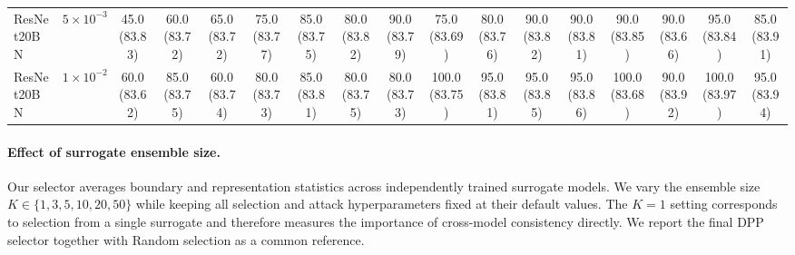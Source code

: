 \begin{table}[t]
{\begin{tabular}{lc|c|cc|cc|cc|cc|cc|cc|cc}
\midrule

ResNet20BN &
$5{\times}10^{-3}$ &
45.0 \small{(83.83)} &
60.0 \small{(83.72)} & 65.0 \small{(83.72)} &
75.0 \small{(83.77)} & 85.0 \small{(83.75)} &
80.0 \small{(83.82)} & 90.0 \small{(83.79)} &
75.0 \small{(83.69)} & 80.0 \small{(83.76)} &
90.0 \small{(83.82)} & 90.0 \small{(83.81)} &
90.0 \small{(83.85)} & 90.0 \small{(83.66)} &
95.0 \small{(83.84)} & 85.0 \small{(83.91)} \\

ResNet20BN &
$1{\times}10^{-2}$ &
60.0 \small{(83.62)} &
85.0 \small{(83.75)} & 60.0 \small{(83.74)} &
80.0 \small{(83.73)} & 85.0 \small{(83.81)} &
80.0 \small{(83.75)} & 80.0 \small{(83.73)} &
100.0 \small{(83.75)} & 95.0 \small{(83.81)} &
95.0 \small{(83.85)} & 95.0 \small{(83.86)} &
100.0 \small{(83.68)} & 90.0 \small{(83.92)} &
100.0 \small{(83.97)} & 95.0 \small{(83.94)} \\

\bottomrule
\end{tabular}
}
\end{table}


\paragraph{Effect of surrogate ensemble size.}
Our selector averages boundary and representation statistics across
independently trained surrogate models. We vary the ensemble size
$K\in\{1,3,5,10,20,50\}$ while keeping all selection and attack
hyperparameters fixed at their default values. The $K=1$ setting
corresponds to selection from a single surrogate and therefore measures
the importance of cross-model consistency directly. We report the final
DPP selector together with Random selection as a common reference.

